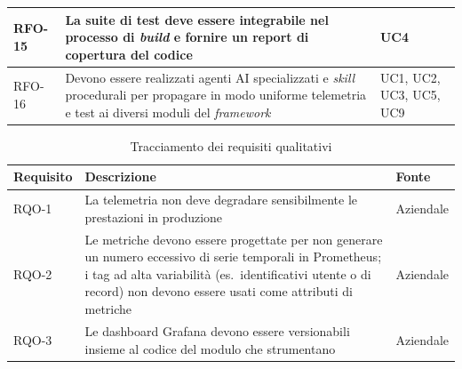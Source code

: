 \begin{longtable}{|C{2cm}|C{8.5cm}|C{2.5cm}|}
      \hline
      RFO-15             & La suite di test deve essere integrabile nel processo di \emph{build} e fornire un report di copertura del codice                                                                                        & UC4                     \\
      \hline
      RFO-16             & Devono essere realizzati agenti AI specializzati e \emph{skill} procedurali per propagare in modo uniforme telemetria e test ai diversi moduli del \emph{framework}                                      & UC1, UC2, UC3, UC5, UC9 \\
      \hline
\end{longtable}

\begin{longtable}{|C{2cm}|C{8.5cm}|C{2.5cm}|}
      \caption{Tracciamento dei requisiti qualitativi} \label{tab:requisiti-qualitativi}                                                                                                                                                                                      \\
      \hline
      \textbf{Requisito} & \textbf{Descrizione}                                                                                                                                                                                                              & \textbf{Fonte} \\
      \hline
      RQO-1              & La telemetria non deve degradare sensibilmente le prestazioni in produzione                                                                                                                                                       & Aziendale      \\
      \hline
      RQO-2              & Le metriche devono essere progettate per non generare un numero eccessivo di serie temporali in Prometheus; i tag ad alta variabilità (es.\ identificativi utente o di record) non devono essere usati come attributi di metriche & Aziendale      \\
      \hline
      RQO-3              & Le dashboard Grafana devono essere versionabili insieme al codice del modulo che strumentano                                                                                                                                      & Aziendale      \\
      \hline
\end{longtable}

